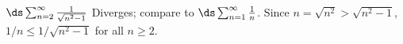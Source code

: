 {$\ds \sum_{n=2}^\infty \frac{1}{\sqrt{n^2-1}}$
}
{Diverges; compare to $\ds \sum_{n=1}^\infty \frac{1}{n}$. Since $n=\sqrt{n^2} > \sqrt{n^2-1}$, $1/n \leq 1/\sqrt{n^2-1}$ for all $n\geq 2$. 
}